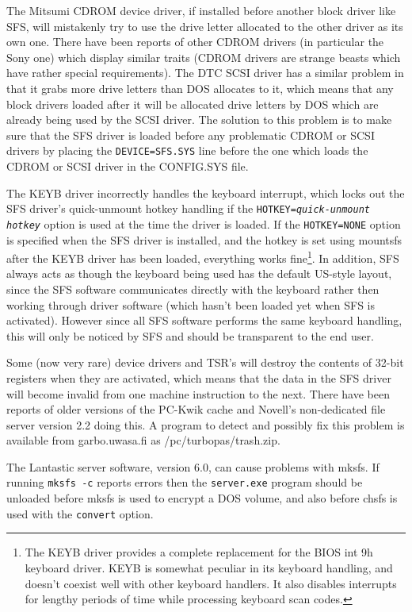 The Mitsumi CDROM device driver, if installed before another block driver like
SFS, will mistakenly try to use the drive letter allocated to the other driver
as its own one.  There have been reports of other CDROM drivers (in particular
the Sony one) which display similar traits (CDROM drivers are strange beasts
which have rather special requirements).  The DTC SCSI driver has a similar
problem in that it grabs more drive letters than DOS allocates to it, which
means that any block drivers loaded after it will be allocated drive letters by
DOS which are already being used by the SCSI driver.  The solution to this
problem is to make sure that the SFS driver is loaded before any problematic
CDROM or SCSI drivers by placing the {\tt DEVICE=SFS.SYS} line before the one which
loads the CDROM or SCSI driver in the CONFIG.SYS file.

The KEYB driver incorrectly handles the keyboard interrupt, which locks out the
SFS driver's quick-unmount hotkey handling if the {\tt HOTKEY={\em quick-unmount hotkey}} 
option is used at the time the driver is loaded.  If the {\tt HOTKEY=NONE} option
is specified when the SFS driver is installed, and the hotkey is set using
mountsfs after the KEYB driver has been loaded, everything works fine\footnote{
		The KEYB driver provides a complete replacement for the BIOS int
              	9h keyboard driver.  KEYB is somewhat peculiar in its keyboard
             	handling, and doesn't coexist well with other keyboard handlers.
             	It also disables interrupts for lengthy periods of time while
              	processing keyboard scan codes.
}.  In
addition, SFS always acts as though the keyboard being used has the default
US-style layout, since the SFS software communicates directly with the keyboard
rather then working through driver software (which hasn't been loaded yet when
SFS is activated).  However since all SFS software performs the same keyboard
handling, this will only be noticed by SFS and should be transparent to the end
user.

Some (now very rare) device drivers and TSR's will destroy the contents of
32-bit registers when they are activated, which means that the data in the SFS
driver will become invalid from one machine instruction to the next.  There
have been reports of older versions of the PC-Kwik cache and Novell's
non-dedicated file server version 2.2 doing this.  A program to detect and
possibly fix this problem is available from garbo.uwasa.fi as
/pc/turbopas/trash.zip.

The Lantastic server software, version 6.0, can cause problems with mksfs.  If
running {\tt mksfs -c} reports errors then the {\tt server.exe} program should be
unloaded before mksfs is used to encrypt a DOS volume, and also before chsfs is
used with the {\tt convert} option.


